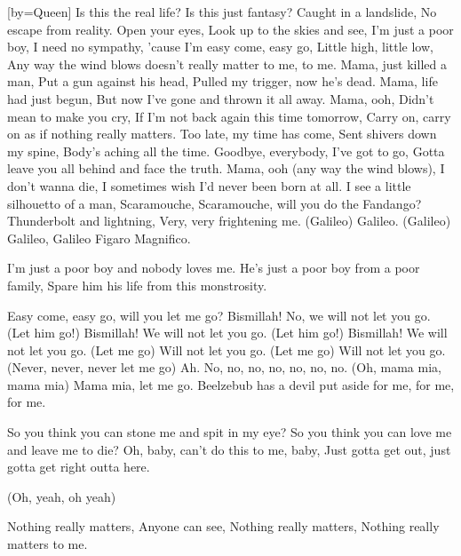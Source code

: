 [by={Queen}]
\beginverse\singlespacing
Is this the real life?
Is this just fantasy?
Caught in a landslide,
No escape from reality.
Open your eyes,
Look up to the skies and see,
I'm just a poor boy, I need no sympathy,
'cause I'm easy come, easy go,
Little high, little low,
Any way the wind blows doesn't really matter to me, to me.
\endverse
\beginverse\singlespacing
Mama, just killed a man,
Put a gun against his head,
Pulled my trigger, now he's dead.
Mama, life had just begun,
But now I've gone and thrown it all away.
Mama, ooh,
Didn't mean to make you cry,
If I'm not back again this time tomorrow,
Carry on, carry on as if nothing really matters.
\endverse
\beginverse\singlespacing
Too late, my time has come,
Sent shivers down my spine,
Body's aching all the time.
Goodbye, everybody, I've got to go,
Gotta leave you all behind and face the truth.
Mama, ooh (any way the wind blows),
I don't wanna die,
I sometimes wish I'd never been born at all.
\endverse
\beginverse\singlespacing
I see a little silhouetto of a man,
Scaramouche, Scaramouche, will you do the Fandango?
Thunderbolt and lightning,
Very, very frightening me.
(Galileo) Galileo.
(Galileo) Galileo,
Galileo Figaro
Magnifico.
\endverse

\beginverse\singlespacing
I'm just a poor boy and nobody loves me.
He's just a poor boy from a poor family,
Spare him his life from this monstrosity.
\endverse

\beginverse\singlespacing
Easy come, easy go, will you let me go?
Bismillah! No, we will not let you go.
(Let him go!) Bismillah! We will not let you go.
(Let him go!) Bismillah! We will not let you go.
(Let me go) Will not let you go.
(Let me go) Will not let you go.
(Never, never, never let me go) Ah.
No, no, no, no, no, no, no.
(Oh, mama mia, mama mia) Mama mia, let me go.
Beelzebub has a devil put aside for me, for me, for me.
\endverse

\beginverse\singlespacing
So you think you can stone me and spit in my eye?
So you think you can love me and leave me to die?
Oh, baby, can't do this to me, baby,
Just gotta get out, just gotta get right outta here.

(Oh, yeah, oh yeah)

Nothing really matters,
Anyone can see,
Nothing really matters,
Nothing really matters to me.
\endverse
\endsong
